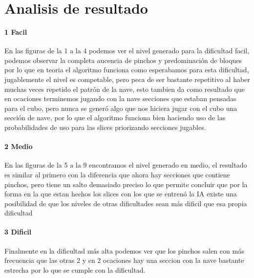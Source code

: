 \documentclass{article}
\begin{document}
\section{Analisis de resultado}
\paragraph{1 Facil}
En las figuras de la 1 a la 4 podemos ver el nivel generado para la dificultad facil, podemos observar la completa aucencia de pinchos y predominación de bloques por lo que en teoria el algoritmo funciona como esperabamos para esta dificultad, jugablemente el nivel es competable, pero peca de ser bastante repetitivo al haber muchas veces repetido el patrón de la nave, esto tambien da como resultado que en ocaciones terminemos jugando con la nave secciones que estaban pensadas para el cubo, pero nunca se generó algo que nos hiciera jugar con el cubo una sección de nave, por lo que el algoritmo funciona bien haciendo uso de las probabilidades de uso para las slices priorizando secciones jugables.
\paragraph{2 Medio}
En las figuras de la 5 a la 9 encontramos el nivel generado en medio, el resultado es similar al primero con la diferencia que ahora hay secciones que contiene pinchos, pero tiene un salto demasiado preciso lo que permite concluir que por la forma en la que estan hechos los slices con los que se entrenó la IA existe una posibilidad de que los niveles de otras dificultades sean más dificil que esa propia dificultad
\paragraph{3 Dificil}
Finalmente en la dificultad más alta podemos ver que los pinchos salen con más frecuencia que las otras 2 y en 2 ocaciones hay una seccion con la nave bastante estrecha por lo que se cumple con la dificultad.
\end{document}
